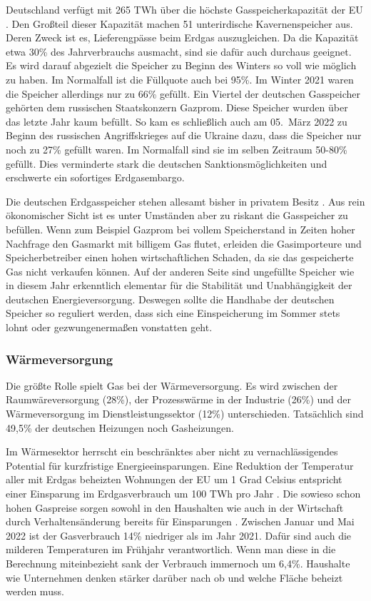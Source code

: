 Deutschland verfügt mit 265 TWh über die höchste Gasspeicherkapazität der EU \cite{iwd}. Den Großteil dieser Kapazität machen 51 unterirdische Kavernenspeicher aus. Deren Zweck ist es, Lieferengpässe beim Erdgas auszugleichen. Da die Kapazität etwa 30\% des Jahrverbrauchs ausmacht, sind sie dafür auch durchaus geeignet.
Es wird darauf abgezielt die Speicher zu Beginn des Winters so voll wie möglich zu haben. Im Normalfall ist die Füllquote auch bei 95\%. Im Winter 2021 waren die Speicher allerdings nur zu 66\% gefüllt. Ein Viertel der deutschen Gasspeicher gehörten dem russischen Staatskonzern Gazprom. Diese Speicher wurden über das letzte Jahr kaum befüllt. So kam es schließlich auch am 05.~März 2022 zu Beginn des russischen Angriffskrieges auf die Ukraine dazu, dass die Speicher nur noch zu 27\% gefüllt waren. Im Normalfall sind sie im selben Zeitraum 50-80\% gefüllt. Dies verminderte stark die deutschen Sanktionsmöglichkeiten und erschwerte ein sofortiges Erdgasembargo.

Die deutschen Erdgasspeicher stehen allesamt bisher in privatem Besitz \cite{leo}. Aus rein ökonomischer Sicht ist es unter Umständen aber zu riskant die Gasspeicher zu befüllen. Wenn zum Beispiel Gazprom bei vollem Speicherstand in Zeiten hoher Nachfrage den Gasmarkt mit billigem Gas flutet, erleiden die Gasimporteure und Speicherbetreiber einen hohen wirtschaftlichen Schaden, da sie das gespeicherte Gas nicht verkaufen können. Auf der anderen Seite sind ungefüllte Speicher wie in diesem Jahr erkenntlich elementar für die Stabilität und Unabhängigkeit der deutschen Energieversorgung. Deswegen sollte die Handhabe der deutschen Speicher so reguliert werden, dass sich eine Einspeicherung im Sommer stets lohnt oder gezwungenermaßen vonstatten geht.

\subsubsection{Wärmeversorgung}

Die größte Rolle spielt Gas bei der Wärmeversorgung. 
Es wird zwischen der Raumwäreversorgung (28\%), der Prozesswärme in der Industrie (26\%) und der Wärmeversorgung im Dienstleistungssektor (12\%) unterschieden. Tatsächlich sind 49,5\% der deutschen Heizungen noch Gasheizungen.  

Im Wärmesektor herrscht ein beschränktes aber nicht zu vernachlässigendes Potential für kurzfristige Energieeinsparungen. Eine Reduktion der Temperatur aller mit Erdgas beheizten Wohnungen der EU um 1 Grad Celsius entspricht einer Einsparung im Erdgasverbrauch um 100 TWh pro Jahr \cite{iea2022}.
Die sowieso schon hohen Gaspreise sorgen sowohl in den Haushalten wie auch in der Wirtschaft durch Verhaltensänderung bereits für Einsparungen \cite{tagesschau-gasverbrauch}. Zwischen Januar und Mai 2022 ist der Gasverbrauch 14\% niedriger als im Jahr 2021. Dafür sind auch die milderen Temperaturen im Frühjahr verantwortlich. Wenn man diese in die Berechnung miteinbezieht sank der Verbrauch immernoch um 6,4\%. Haushalte wie Unternehmen denken stärker darüber nach ob und welche Fläche beheizt werden muss.


